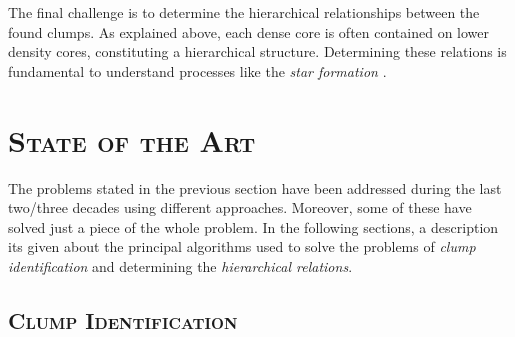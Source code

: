 \documentclass[letter, 11pt]{article}
\begin{document}
The final challenge is to determine the hierarchical relationships between the found clumps. As explained above, each dense core is often contained on lower density cores, constituting a hierarchical structure. Determining these relations is fundamental to understand processes like the \textit{star formation} \cite{Alves}.

    



\newpage
\section{\textsc{State of the Art}} \label{soa}

The problems stated in the previous section have been addressed during the last two/three decades using different approaches. Moreover, some of these have solved just a piece of the whole problem. In the following sections, a description its given about the principal algorithms used to solve the problems of \textit{clump identification} and determining the \textit{hierarchical relations}.

\subsection{\textsc{Clump Identification}} \label{clumping}
\end{document}
